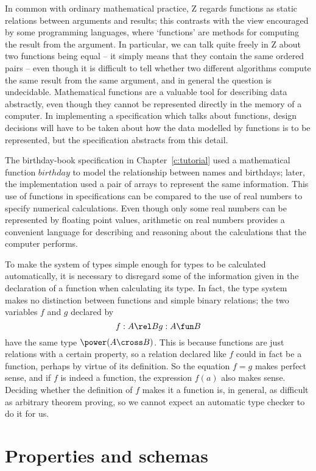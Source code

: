 In common with ordinary mathematical practice, Z regards functions
as static relations between arguments and results; this contrasts
with the view encouraged by some programming languages, where
`functions' are methods for computing the result from the argument.
In particular, we can talk quite freely in Z about two functions
being equal -- it simply means that they contain the same ordered
pairs -- even though it is difficult to tell whether two different
algorithms compute the same result from the same argument, and in
general the question is undecidable.  Mathematical functions are a
valuable tool for describing data abstractly, even though they
cannot be represented directly in the memory of a computer.  In
implementing a specification which talks about functions, design
decisions will have to be taken about how the data modelled by
functions is to be represented, but the specification abstracts from
this detail.

The birthday-book specification in Chapter~\ref{c:tutorial} used a
mathematical function $birthday$ to model the relationship between
names and birthdays; later, the implementation used a pair of arrays
to represent the same information.  This use of functions in
specifications can be compared to the use of real numbers to specify
numerical calculations. Even though only some real numbers can be
represented by floating point values, arithmetic on real numbers
provides a convenient language for describing and reasoning about
the calculations that the computer performs.

To make the system of types simple enough for types to be calculated
automatically, it is necessary to disregard some of the information
given in the declaration of a function when calculating its type.
In fact, the type system makes no distinction between functions and
simple binary relations; the two variables $f$ and $g$ declared by
\[ f: A \rel B \\
   g: A \fun B \]
have the same type $\power (A \cross B)$.  This is because functions
are just relations with a certain property, so a relation declared
like $f$ could in fact be a function, perhaps by virtue of its
definition. So the equation $f = g$ makes perfect sense, and if $f$
is indeed a function, the expression $f(a)$ also makes sense.
Deciding whether the definition of $f$ makes it a function is, in
general, as difficult as arbitrary theorem proving, so we cannot
expect an automatic type checker to do it for us.

\section{Properties and schemas}\label{s:propschema}

